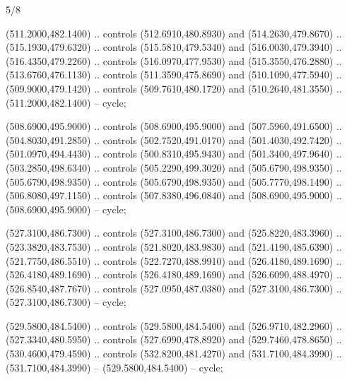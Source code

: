 \begin{flagdescription}{5/8}
\begin{scope}[shift={(m)}]
\begin{scope}[scale=\flagwidth/220,y=0.1mm, x=0.1mm, yscale=-1,shift={(-596,-360)}]
\begin{scope}[cm={{-1.0,0.0,0.0,1.0,(1193.9797,0.0)}}]
\begin{scope}[draw=black,line join=round,line cap=round,line width=0.381\lw]
\begin{scope}[fill=white]
 (511.2000,482.1400) .. controls (512.6910,480.8930) and
  (514.2630,479.8670) .. (515.1930,479.6320) .. controls (515.5810,479.5340) and
  (516.0030,479.3940) .. (516.4350,479.2260) .. controls (516.0970,477.9530) and
  (515.3550,476.2880) .. (513.6760,476.1130) .. controls (511.3590,475.8690) and
  (510.1090,477.5940) .. (509.9000,479.1420) .. controls (509.7610,480.1720) and
  (510.2640,481.3550) .. (511.2000,482.1400) -- cycle;

 (508.6900,495.9000) .. controls (508.6900,495.9000) and
  (507.5960,491.6500) .. (504.8030,491.2850) .. controls (502.7520,491.0170) and
  (501.4030,492.7420) .. (501.0970,494.4430) .. controls (500.8310,495.9430) and
  (501.3400,497.9640) .. (503.2850,498.6340) .. controls (505.2290,499.3020) and
  (505.6790,498.9350) .. (505.6790,498.9350) .. controls (505.6790,498.9350) and
  (505.7770,498.1490) .. (506.8080,497.1150) .. controls (507.8380,496.0840) and
  (508.6900,495.9000) .. (508.6900,495.9000) -- cycle;

 (527.3100,486.7300) .. controls (527.3100,486.7300) and
  (525.8220,483.3960) .. (523.3820,483.7530) .. controls (521.8020,483.9830) and
  (521.4190,485.6390) .. (521.7750,486.5510) .. controls (522.7270,488.9910) and
  (526.4180,489.1690) .. (526.4180,489.1690) .. controls (526.4180,489.1690) and
  (526.6090,488.4970) .. (526.8540,487.7670) .. controls (527.0950,487.0380) and
  (527.3100,486.7300) .. (527.3100,486.7300) -- cycle;

 (529.5800,484.5400) .. controls (529.5800,484.5400) and
  (526.9710,482.2960) .. (527.3340,480.5950) .. controls (527.6990,478.8920) and
  (529.7460,478.8650) .. (530.4600,479.4590) .. controls (532.8200,481.4270) and
  (531.7100,484.3990) .. (531.7100,484.3990) -- (529.5800,484.5400) -- cycle;


\end{scope}
\end{scope}
\end{scope}
\end{scope}
\end{scope}
\end{flagdescription}
